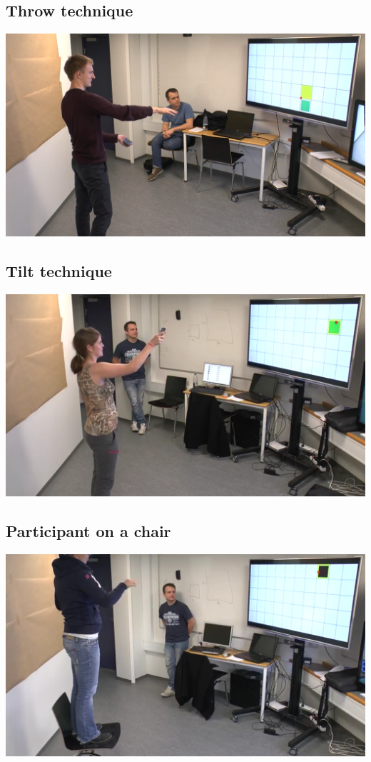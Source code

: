 \subsection*{Throw technique}
\includegraphics[width=\textwidth]{appendix/images/sune_nilausen_throw.png}

\subsection*{Tilt technique}
\includegraphics[width=\textwidth]{appendix/images/mette_tilt.png}

\subsection*{Participant on a chair}
\includegraphics[width=\textwidth]{appendix/images/rikke_on_chair.png}


